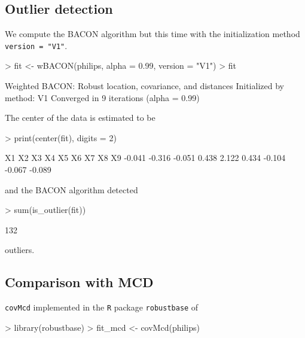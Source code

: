\documentclass[a4paper,oneside,11pt,DIV=12]{scrartcl}
\newcommand{\code}[1]{{\texttt{#1}}}
\begin{document}
\subsection*{Outlier detection}
We compute the BACON algorithm but this time with the initialization method \code{version = "V1"}.  
\begin{Schunk}
\begin{Sinput}
> fit <- wBACON(philips, alpha = 0.99, version = "V1")
> fit
\end{Sinput}
\begin{Soutput}
Weighted BACON: Robust location, covariance, and distances
Initialized by method: V1 
Converged in 9 iterations (alpha = 0.99)
\end{Soutput}
\end{Schunk}
\noindent The center of the data is estimated to be
\begin{Schunk}
\begin{Sinput}
> print(center(fit), digits = 2)
\end{Sinput}
\begin{Soutput}
    X1     X2     X3     X4     X5     X6     X7     X8     X9 
-0.041 -0.316 -0.051  0.438  2.122  0.434 -0.104 -0.067 -0.089 
\end{Soutput}
\end{Schunk}
\noindent and the BACON algorithm detected
\begin{Schunk}
\begin{Sinput}
> sum(is_outlier(fit))
\end{Sinput}
\begin{Soutput}
[1] 132
\end{Soutput}
\end{Schunk}
\noindent outliers.
 
\subsection*{Comparison with MCD}
\citet{rousseeuw_driessen_1999}

\code{covMcd} implemented in the \code{R} package \code{robustbase} of \citet{machler_rousseeuw_etal_2020}


\begin{Schunk}
\begin{Sinput}
> library(robustbase)
> fit_mcd <- covMcd(philips)
\end{Sinput}
\end{Schunk}
\end{document}
